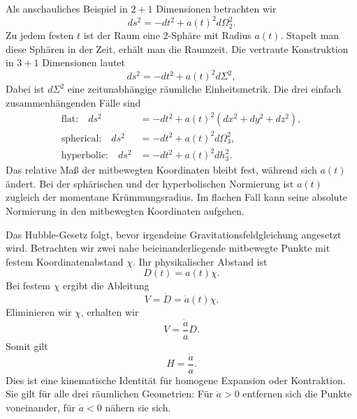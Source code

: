 Als anschauliches Beispiel in \(2+1\) Dimensionen betrachten wir
\begin{equation}
ds^2 = -dt^2 + a(t)^2 d\Omega_2^2.
\label{eq:c03-two-plus-one}
\end{equation}
Zu jedem festen \(t\) ist der Raum eine \(2\)-Sphäre mit Radius \(a(t)\). Stapelt man diese Sphären in der Zeit, erhält man die Raumzeit. Die vertraute Konstruktion in \(3+1\) Dimensionen lautet
\begin{equation}
ds^2 = -dt^2 + a(t)^2 d\Sigma^2,
\label{eq:c03-frw-general}
\end{equation}
Dabei ist \(d\Sigma^2\) eine zeitunabhängige räumliche Einheitsmetrik. Die drei einfach zusammenhängenden Fälle sind
\begin{align}
\text{flat:}\quad
ds^2&=-dt^2+a(t)^2\left(dx^2+dy^2+dz^2\right),\label{eq:c03-frw-flat}\\
\text{spherical:}\quad
ds^2&=-dt^2+a(t)^2d\Omega_3^2,\label{eq:c03-frw-spherical}\\
\text{hyperbolic:}\quad
ds^2&=-dt^2+a(t)^2dh_3^2.\label{eq:c03-frw-hyperbolic}
\end{align}
Das relative Maß der mitbewegten Koordinaten bleibt fest, während sich \(a(t)\) ändert. Bei der sphärischen und der hyperbolischen Normierung ist \(a(t)\) zugleich der momentane Krümmungsradius. Im flachen Fall kann seine absolute Normierung in den mitbewegten Koordinaten aufgehen.

Das Hubble-Gesetz folgt, bevor irgendeine Gravitationsfeldgleichung angesetzt wird. Betrachten wir zwei nahe beieinanderliegende mitbewegte Punkte mit festem Koordinatenabstand \(\chi\). Ihr physikalischer Abstand ist
\begin{equation}
D(t)=a(t)\chi.
\label{eq:c03-comoving-distance}
\end{equation}
Bei festem \(\chi\) ergibt die Ableitung
\begin{equation}
V=\dot D=\dot a(t)\chi.
\end{equation}
Eliminieren wir \(\chi\), erhalten wir
\begin{equation}
V = \frac{\dot a}{a} D.
\label{eq:c03-hubble-law}
\end{equation}
Somit gilt
\begin{equation}
H = \frac{\dot a}{a}.
\label{eq:c03-hubble-parameter}
\end{equation}
Dies ist eine kinematische Identität für homogene Expansion oder Kontraktion. Sie gilt für alle drei räumlichen Geometrien: Für \(\dot a>0\) entfernen sich die Punkte voneinander, für \(\dot a<0\) nähern sie sich.

